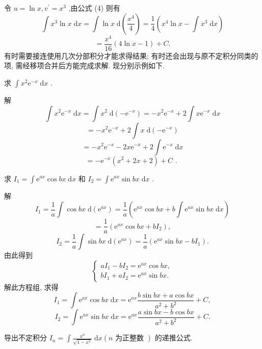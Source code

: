 \begin{solution}

\end{solution}
令 \(u = \ln x,{v}^{\prime } = {x}^{3}\) ,由公式 (4) 则有
\[
\int {x}^{3}\ln x\mathrm{\;d}x = \int \ln x\mathrm{\;d}\left( \frac{{x}^{4}}{4}\right)  = \frac{1}{4}\left( {{x}^{4}\ln x-\int {x}^{3}\mathrm{\;d}x}\right)
\]
\[
= \frac{{x}^{4}}{16}\left( {4\ln x - 1}\right)  + C.
\]
有时需要接连使用几次分部积分才能求得结果; 有时还会出现与原不定积分同类的项, 需经移项合并后方能完成求解. 现分别示例如下.

\begin{example}

\end{example}
求 \(\int {x}^{2}{\mathrm{e}}^{-x}\mathrm{\;d}x\) .

解
\[
\int {x}^{2}{\mathrm{e}}^{-x}\mathrm{\;d}x = \int {x}^{2}\mathrm{\;d}\left( {-{\mathrm{e}}^{-x}}\right)  =  - {x}^{2}{\mathrm{e}}^{-x} + 2\int x{\mathrm{e}}^{-x}\mathrm{\;d}x
\]
\[
=  - {x}^{2}{\mathrm{e}}^{-x} + 2\int x\mathrm{\;d}\left( {-{\mathrm{e}}^{-x}}\right)
\]
\[
=  - {x}^{2}{\mathrm{e}}^{-x} - {2x}{\mathrm{e}}^{-x} + 2\int {\mathrm{e}}^{-x}\mathrm{\;d}x
\]
\[
=  - {\mathrm{e}}^{-x}\left( {{x}^{2} + {2x} + 2}\right)  + C\text{ . }
\]
\begin{example}

\end{example}
求 \({I}_{1} = \int {\mathrm{e}}^{ax}\cos {bx}\mathrm{\;d}x\) 和 \({I}_{2} = \int {\mathrm{e}}^{ax}\sin {bx}\mathrm{\;d}x\) .

解
\[
{I}_{1} = \frac{1}{a}\int \cos {bx}\mathrm{\;d}\left( {\mathrm{e}}^{ax}\right)  = \frac{1}{a}\left( {{\mathrm{e}}^{ax}\cos {bx} + b\int {\mathrm{e}}^{ax}\sin {bx}\mathrm{\;d}x}\right)
\]
\[
= \frac{1}{a}\left( {{\mathrm{e}}^{ax}\cos {bx} + b{I}_{2}}\right) ,
\]
\[
{I}_{2} = \frac{1}{a}\int \sin {bx}\mathrm{\;d}\left( {\mathrm{e}}^{ax}\right)  = \frac{1}{a}\left( {{\mathrm{e}}^{ax}\sin {bx} - b{I}_{1}}\right) .
\]
由此得到
\[
\left\{  \begin{array}{l} a{I}_{1} - b{I}_{2} = {\mathrm{e}}^{ax}\cos {bx}, \\  b{I}_{1} + a{I}_{2} = {\mathrm{e}}^{ax}\sin {bx}. \end{array}\right.
\]
解此方程组, 求得
\[
{I}_{1} = \int {\mathrm{e}}^{ax}\cos {bx}\mathrm{\;d}x = {\mathrm{e}}^{ax}\frac{b\sin {bx} + a\cos {bx}}{{a}^{2} + {b}^{2}} + C,
\]
\[
{I}_{2} = \int {\mathrm{e}}^{ax}\sin {bx}\mathrm{\;d}x = {\mathrm{e}}^{ax}\frac{a\sin {bx} - b\cos {bx}}{{a}^{2} + {b}^{2}} + C.
\]
\begin{example}

\end{example}
导出不定积分 \({I}_{n} = \int \frac{{x}^{n}}{\sqrt{1 - {x}^{2}}}\mathrm{\;d}x\left( {n\text{ 为正整数 }}\right)\) 的递推公式.


